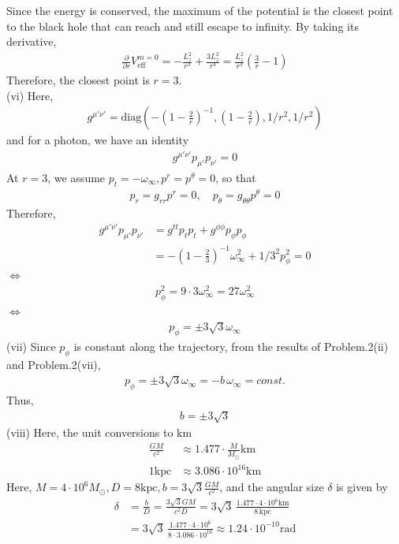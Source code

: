 \documentclass[12pt]{article}
\begin{document}
Since the energy is conserved, the maximum of the potential is the closest point to the black hole that can reach and still escape to infinity.
By taking its derivative,
\begin{align}
\frac{\partial}{\partial r} V_{\mathrm{eff}}^{m =0} = - \frac{L_z^2}{r^3} + \frac{3 L_z^2}{r^4} = \frac{L_z^2}{r^3} \left(\frac{3}{r} - 1\right)
\end{align}
Therefore, the closest point is $r = 3$.\\
(vi)
Here,
\begin{align}
g^{\mu' \nu'} = \mathrm{diag} \left(- \left(1 - \frac{2}{r}\right)^{-1}, \left(1 - \frac{2}{r}\right), 1/r^2, 1/r^2 \right)
\end{align}
and for a photon, we have an identity
\begin{align}
g^{\mu' \nu'} p_{\mu'} p_{\nu'} = 0
\end{align}
At $r = 3$, we assume $p_{t} = - \omega_{\infty}, p^{r} = p^{\theta} =0$, so that
\begin{align}
p_{r} = g_{r r} p^{r} = 0, \quad p_{\theta} = g_{\theta \theta} p^{\theta} = 0
\end{align}
Therefore,
\begin{align}
g^{\mu' \nu'} p_{\mu'} p_{\nu'} &= g^{tt} p_{t} p_{t} + g^{\phi \phi} p_{\phi} p_{\phi}\\
&= - \left(1 - \frac{2}{3}\right)^{-1} \omega_{\infty}^2 + 1/3^2 p_{\phi}^2 = 0
\end{align}
$\Leftrightarrow$
\begin{align}
p_{\phi}^2 = 9 \cdot 3 \omega_{\infty}^2 = 27 \omega_{\infty}^2
\end{align}
$\Leftrightarrow$
\begin{align}
p_{\phi} = \pm 3 \sqrt{3} \omega_{\infty}
\end{align}
(vii) Since $p_{\phi}$ is constant along the trajectory, from the results of Problem.2(ii) and Problem.2(vii),
\begin{align}
p_{\phi} = \pm 3 \sqrt{3} \omega_{\infty} = - b\, \omega_{\infty} = const.
\end{align}
Thus, 
\begin{align}
b = \pm 3 \sqrt{3}
\end{align}
(viii)
Here, the unit conversions to $\mathrm{km}$
\begin{align}
\frac{G M}{c^2} &\approx 1.477 \cdot \frac{M}{M_{\odot}} \mathrm{km}\\
1 \mathrm{kpc} &\approx 3.086 \cdot 10^{16} \mathrm{km}
\end{align}
Here, $M = 4 \cdot 10^{6} M_{\odot}, D = 8 \mathrm{kpc}, b = 3 \sqrt{3} \frac{G M}{c^2}$, and the angular size $\delta$ is given by
\begin{align}
\delta &= \frac{b}{D} =  \frac{3 \sqrt{3} G M}{c^2 D} = 3 \sqrt{3} \,\frac{1.477 \cdot 4 \cdot 10^{6} \mathrm{km}}{8 \,\mathrm{kpc}}\\
&= 3 \sqrt{3} \,\frac{1.477 \cdot 4 \cdot 10^{6}}{8 \cdot 3.086 \cdot 10^{16}} \approx 1.24 \cdot 10^{-10} \mathrm{rad}
\end{align}
\end{document}
